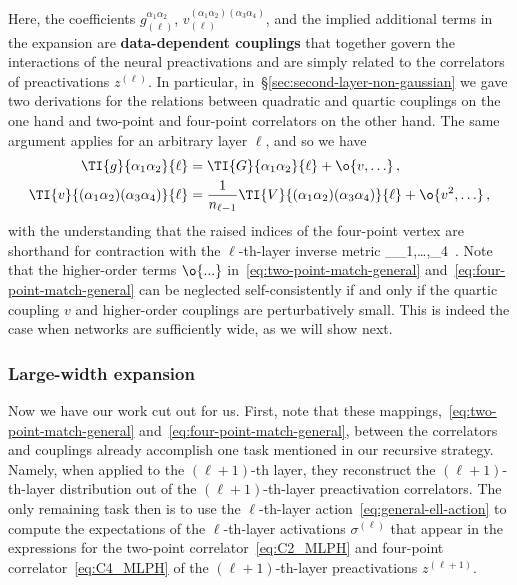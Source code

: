 Here, the coefficients $g^{\alpha_1\alpha_2}_{(\ell)}$, $v^{(\alpha_1\alpha_2)(\alpha_3\alpha_4)}_{(\ell)}$,
and the implied additional terms in the expansion are \textbf{data-dependent couplings} that together govern the interactions of the neural preactivations and are simply related to the correlators of preactivations $z^{(\ell)}$. In particular, in~\S\ref{sec:second-layer-non-gaussian} we gave two derivations  for the relations between quadratic and quartic couplings on the one hand and two-point and four-point correlators on the other hand. The same argument applies for an arbitrary layer $\ell$, and so we have
\begin{align}
\TI{g}{\alpha_1\alpha_2}{\ell}&=\TI{G}{\alpha_1\alpha_2}{\ell}+\o{v,\ldots}\, ,\label{eq:two-point-match-general}\\
\TI{v}{(\alpha_1\alpha_2)(\alpha_3\alpha_4)}{\ell}&=\frac{1}{n_{\ell-1}}\TI{V}{(\alpha_1\alpha_2)(\alpha_3\alpha_4)}{\ell}+\o{v^2, \ldots}\, , \label{eq:four-point-match-general} 
\end{align}
with the understanding that the raised indices of the four-point vertex are shorthand for contraction with the $\ell$-th-layer inverse metric
\be\label{eq:vertex-UUUU-dddd}
\equiv \sum_{\beta_1,\ldots,\beta_4\in\D}\, .
\ee
Note that the higher-order terms $\o{...}$ in~\eqref{eq:two-point-match-general} and~\eqref{eq:four-point-match-general} can be neglected self-consistently if and only if the quartic coupling $v$ and higher-order couplings are perturbatively small. This is indeed the case when networks are sufficiently wide,
as we will show next.






\subsubsection{Large-width expansion}
Now we have our work cut out for us. 
First, note that these mappings,~\eqref{eq:two-point-match-general} and~\eqref{eq:four-point-match-general},
between the correlators and couplings already accomplish one task mentioned in our recursive strategy. Namely, when applied to the $(\ell+1)$-th layer, they reconstruct the $(\ell+1)$-th-layer distribution out of the $(\ell+1)$-th-layer preactivation correlators. The only remaining task then is to use the $\ell$-th-layer action~\eqref{eq:general-ell-action} to compute
the expectations of the $\ell$-th-layer activations $\sigma^{(\ell)}$ that appear in the expressions for the two-point correlator~\eqref{eq:C2_MLPH} and four-point correlator~\eqref{eq:C4_MLPH} of the $(\ell+1)$-th-layer preactivations $z^{(\ell+1)}$. 

